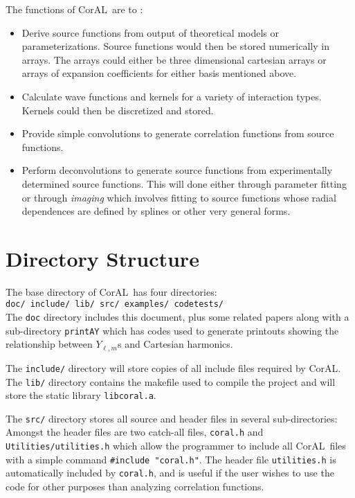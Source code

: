\documentclass[10pt]{article}
\def\tab{\hspace*{9pt}}
\newcommand{\coral}{CorAL}
\begin{document}
The functions of \coral\ are to :
\begin{itemize}
\item Derive source functions from output of theoretical models or parameterizations. Source functions would then be stored numerically in arrays. The arrays could either be three dimensional cartesian arrays or arrays of expansion coefficients for either basis mentioned above.
\item Calculate wave functions and kernels for a variety of interaction types. Kernels could then be discretized and stored.
\item Provide simple convolutions to generate correlation functions from source functions.
\item Perform deconvolutions to generate source functions from experimentally determined source functions. This will done either through parameter fitting or through {\it imaging} which involves fitting to source functions whose radial dependences are defined by splines or other very general forms. 
\end{itemize}

\section{Directory Structure}

The base directory of \coral\ has four directories:\\
{\tt doc/ \tab include/ \tab lib/ \tab src/ \tab examples/ \tab codetests/}\\
The {\tt doc} directory includes this document, plus some related papers along with a sub-directory {\tt printAY} which has codes used to generate printouts showing the relationship between $Y_{\ell,m}$s and Cartesian harmonics.

The {\tt include/} directory will store copies of all include files required by \coral. The {\tt lib/} directory contains the  makefile used to compile the project and will store the static library {\tt libcoral.a}.

The {\tt src/} directory stores all source and header files in several sub-directories:\\
Amongst the header files are two catch-all files, {\tt coral.h} and {\tt Utilities/utilities.h} which allow the programmer to include all \coral\ files with a simple command {\tt \#include "coral.h"}. The header file {\tt utilities.h} is automatically included by {\tt coral.h}, and is useful if the user wishes to use the code for other purposes than analyzing correlation functions.
\end{document}
